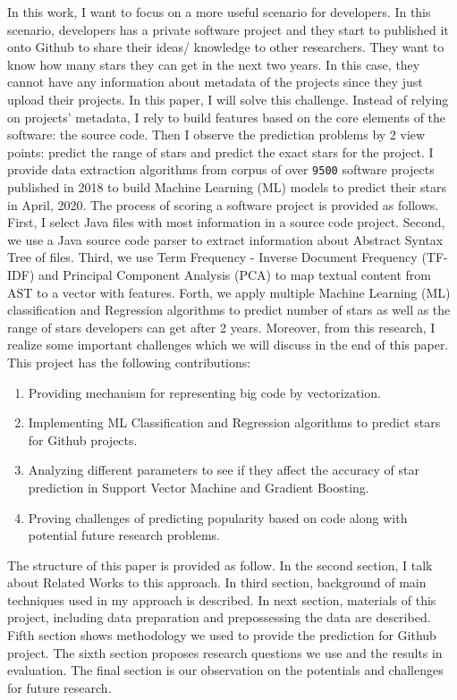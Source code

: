 In this work, I want to focus on a more useful scenario for developers. In this scenario, developers has a private software project and they start to published it onto Github to share their ideas/ knowledge to other researchers. They want to know how many stars they can get in the next two years. In this case, they cannot have any information about metadata of the projects since they just upload their projects. In this paper, I will solve this challenge. Instead of relying on projects' metadata, I rely to build features based on the core elements of the software: the source code. Then I observe the prediction problems by 2 view points: predict the range of stars and predict the exact stars for the project. I provide data extraction algorithms from corpus of over \texttt{9500} software projects published in 2018 to build Machine Learning (ML) models to predict their stars in April, 2020. 
The process of scoring a software project is provided as follows. First, I select Java files with most information in a source code project. Second, we use a Java source code parser to extract information about Abstract Syntax Tree of files. Third, we use Term Frequency - Inverse Document Frequency (TF-IDF) and Principal Component Analysis (PCA) to map textual content from AST to a vector with features. Forth, we apply multiple Machine Learning (ML) classification and Regression algorithms to predict number of stars as well as the range of stars developers can get after 2 years. Moreover, from this research, I realize some important challenges which we will discuss in the end of this paper. This project has the following contributions:
\begin{enumerate}
    \item Providing mechanism for representing big code by vectorization.
    \item Implementing ML Classification and Regression algorithms to predict stars for Github projects.
    \item Analyzing different parameters to see if they affect the accuracy of star prediction in Support Vector Machine and Gradient Boosting.
    \item Proving challenges of predicting popularity based on code along with potential future research problems. 
\end{enumerate}

The structure of this paper is provided as follow. In the second section, I talk about Related Works to this approach. In third section, background of main techniques used in my approach is described. In next section, materials of this project, including data preparation and prepossessing the data are described. Fifth section shows methodology we used to provide the prediction for Github project. The sixth section proposes research questions we use and the results in evaluation. The final section is our observation on the potentials and challenges for future research. 

